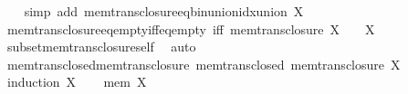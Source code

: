 \begin{isabellebody}
%
\isadelimproof
\ \ %
\endisadelimproof
%
\isatagproof
{}\isamarkupfalse%
\ {\isacharparenleft}{\kern0pt}simp\ add{\isacharcolon}{\kern0pt}\ mem{\isacharunderscore}{\kern0pt}trans{\isacharunderscore}{\kern0pt}closure{\isacharunderscore}{\kern0pt}eq{\isacharunderscore}{\kern0pt}bin{\isacharunderscore}{\kern0pt}union{\isacharunderscore}{\kern0pt}idx{\isacharunderscore}{\kern0pt}union{\isacharbrackleft}{\kern0pt}\ {\isacharquery}{\kern0pt}X{\isacharequal}{\kern0pt}{\isachardoublequoteopen}{\isacharbraceleft}{\kern0pt}{\isacharbraceright}{\kern0pt}{\isachardoublequoteclose}{\isacharbrackright}{\kern0pt}{\isacharparenright}{\kern0pt}%
\endisatagproof
{\isafoldproof}%
%
\isadelimproof
\isanewline
%
\endisadelimproof
\isanewline
{}\isamarkupfalse%
\ mem{\isacharunderscore}{\kern0pt}trans{\isacharunderscore}{\kern0pt}closure{\isacharunderscore}{\kern0pt}eq{\isacharunderscore}{\kern0pt}empty{\isacharunderscore}{\kern0pt}iff{\isacharunderscore}{\kern0pt}eq{\isacharunderscore}{\kern0pt}empty\ {\isacharbrackleft}{\kern0pt}iff{\isacharbrackright}{\kern0pt}{\isacharcolon}{\kern0pt}\ {\isachardoublequoteopen}mem{\isacharunderscore}{\kern0pt}trans{\isacharunderscore}{\kern0pt}closure\ X\ {\isacharequal}{\kern0pt}\ {\isacharbraceleft}{\kern0pt}{\isacharbraceright}{\kern0pt}\ {\isasymlongleftrightarrow}\ X\ {\isacharequal}{\kern0pt}\ {\isacharbraceleft}{\kern0pt}{\isacharbraceright}{\kern0pt}{\isachardoublequoteclose}\isanewline
%
\isadelimproof
\ \ %
\endisadelimproof
%
\isatagproof
{}\isamarkupfalse%
\ subset{\isacharunderscore}{\kern0pt}mem{\isacharunderscore}{\kern0pt}trans{\isacharunderscore}{\kern0pt}closure{\isacharunderscore}{\kern0pt}self\ \isamarkupfalse%
\ auto%
\endisatagproof
{\isafoldproof}%
%
\isadelimproof
\isanewline
%
\endisadelimproof
\isanewline
{}\isamarkupfalse%
\ mem{\isacharunderscore}{\kern0pt}trans{\isacharunderscore}{\kern0pt}closed{\isacharunderscore}{\kern0pt}mem{\isacharunderscore}{\kern0pt}trans{\isacharunderscore}{\kern0pt}closure{\isacharcolon}{\kern0pt}\ {\isachardoublequoteopen}mem{\isacharunderscore}{\kern0pt}trans{\isacharunderscore}{\kern0pt}closed\ {\isacharparenleft}{\kern0pt}mem{\isacharunderscore}{\kern0pt}trans{\isacharunderscore}{\kern0pt}closure\ X{\isacharparenright}{\kern0pt}{\isachardoublequoteclose}\isanewline
%
\isadelimproof
%
\endisadelimproof
%
\isatagproof
{}\isamarkupfalse%
\ {\isacharparenleft}{\kern0pt}induction\ X{\isacharparenright}{\kern0pt}\isanewline
\ \ \isamarkupfalse%
\ {\isacharparenleft}{\kern0pt}mem\ X{\isacharparenright}{\kern0pt}\isanewline

\end{isabellebody}
